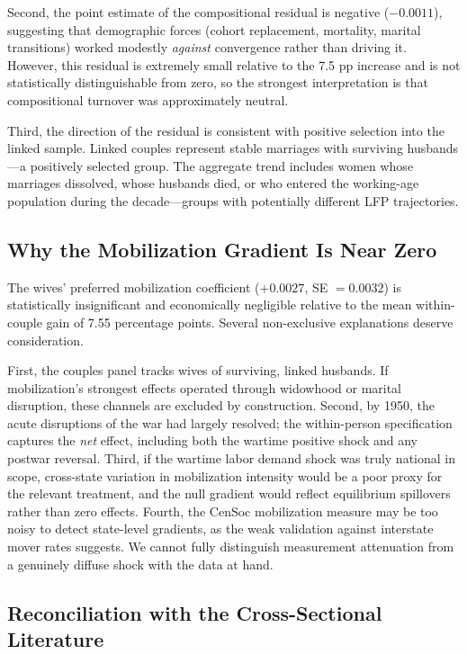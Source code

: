 \documentclass[12pt]{article}
\begin{document}
Second, the point estimate of the compositional residual is negative ($-0.0011$), suggesting that demographic forces (cohort replacement, mortality, marital transitions) worked modestly \textit{against} convergence rather than driving it. However, this residual is extremely small relative to the 7.5 pp increase and is not statistically distinguishable from zero, so the strongest interpretation is that compositional turnover was approximately neutral.

Third, the direction of the residual is consistent with positive selection into the linked sample. Linked couples represent stable marriages with surviving husbands---a positively selected group. The aggregate trend includes women whose marriages dissolved, whose husbands died, or who entered the working-age population during the decade---groups with potentially different LFP trajectories.

\subsection{Why the Mobilization Gradient Is Near Zero}

The wives' preferred mobilization coefficient ($+0.0027$, SE $= 0.0032$) is statistically insignificant and economically negligible relative to the mean within-couple gain of 7.55 percentage points. Several non-exclusive explanations deserve consideration.

First, the couples panel tracks wives of surviving, linked husbands. If mobilization's strongest effects operated through widowhood or marital disruption, these channels are excluded by construction. Second, by 1950, the acute disruptions of the war had largely resolved; the within-person specification captures the \textit{net} effect, including both the wartime positive shock and any postwar reversal. Third, if the wartime labor demand shock was truly national in scope, cross-state variation in mobilization intensity would be a poor proxy for the relevant treatment, and the null gradient would reflect equilibrium spillovers rather than zero effects. Fourth, the CenSoc mobilization measure may be too noisy to detect state-level gradients, as the weak validation against interstate mover rates suggests. We cannot fully distinguish measurement attenuation from a genuinely diffuse shock with the data at hand.

\subsection{Reconciliation with the Cross-Sectional Literature}
\end{document}
